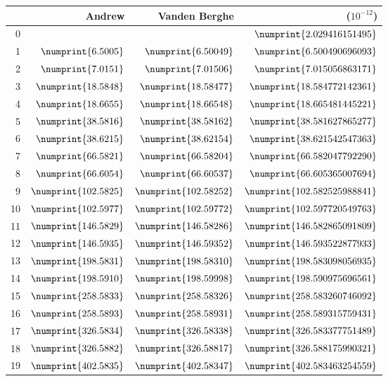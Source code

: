 \begin{tabular}{r|rrr}
& Andrew \cite{andrew_correction_1989} & Vanden Berghe \cite{vandenberghe_modified_1995} & \pyslise{} ($10^{-12}$) \\
\midrule
0 &  &  & $\numprint{2.029416151495}$ \\
1 & $\numprint{6.5005}$ & $\numprint{6.50049}$ & $\numprint{6.500490696093}$ \\
2 & $\numprint{7.0151}$ & $\numprint{7.01506}$ & $\numprint{7.015056863171}$ \\
3 & $\numprint{18.5848}$ & $\numprint{18.58477}$ & $\numprint{18.584772142361}$ \\
4 & $\numprint{18.6655}$ & $\numprint{18.66548}$ & $\numprint{18.665481445221}$ \\
5 & $\numprint{38.5816}$ & $\numprint{38.58162}$ & $\numprint{38.581627865277}$ \\
6 & $\numprint{38.6215}$ & $\numprint{38.62154}$ & $\numprint{38.621542547363}$ \\
7 & $\numprint{66.5821}$ & $\numprint{66.58204}$ & $\numprint{66.582047792290}$ \\
8 & $\numprint{66.6054}$ & $\numprint{66.60537}$ & $\numprint{66.605365007694}$ \\
9 & $\numprint{102.5825}$ & $\numprint{102.58252}$ & $\numprint{102.582525988841}$ \\
10 & $\numprint{102.5977}$ & $\numprint{102.59772}$ & $\numprint{102.597720549763}$ \\
11 & $\numprint{146.5829}$ & $\numprint{146.58286}$ & $\numprint{146.582865091809}$ \\
12 & $\numprint{146.5935}$ & $\numprint{146.59352}$ & $\numprint{146.593522877933}$ \\
13 & $\numprint{198.5831}$ & $\numprint{198.58310}$ & $\numprint{198.583098056935}$ \\
14 & $\numprint{198.5910}$ & $\numprint{198.59998}$ & $\numprint{198.590975696561}$ \\
15 & $\numprint{258.5833}$ & $\numprint{258.58326}$ & $\numprint{258.583260746092}$ \\
16 & $\numprint{258.5893}$ & $\numprint{258.58931}$ & $\numprint{258.589315759431}$ \\
17 & $\numprint{326.5834}$ & $\numprint{326.58338}$ & $\numprint{326.583377751489}$ \\
18 & $\numprint{326.5882}$ & $\numprint{326.58817}$ & $\numprint{326.588175990321}$ \\
19 & $\numprint{402.5835}$ & $\numprint{402.58347}$ & $\numprint{402.583463254559}$ \\
\end{tabular}

